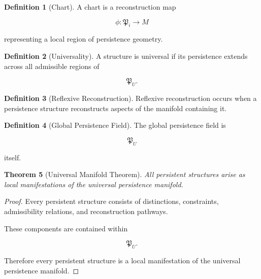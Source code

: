 \documentclass[12pt,oneside]{article}
\newtheorem{theorem}{Theorem}[section] \newtheorem{lemma}[theorem]{Lemma} \newtheorem{proposition}[theorem]{Proposition} \newtheorem{corollary}[theorem]{Corollary}
\theoremstyle{definition}
\newtheorem{definition}[theorem]{Definition} \newtheorem{axiom}[theorem]{Axiom} \newtheorem{remark}[theorem]{Remark} \newtheorem{example}[theorem]{Example}
\begin{document}
\begin{definition}[Chart]

A chart is a reconstruction map

\[
\phi :
\mathfrak P_i
\rightarrow
M
\]

representing a local region of persistence geometry.

\end{definition}

\begin{definition}[Universality]

A structure is universal if its persistence extends across all admissible regions of

\[
\mathfrak P_U.
\]

\end{definition}

\begin{definition}[Reflexive Reconstruction]

Reflexive reconstruction occurs when a persistence structure reconstructs aspects of the manifold containing it.

\end{definition}

\begin{definition}[Global Persistence Field]

The global persistence field is

\[
\mathfrak P_U
\]

itself.

\end{definition}

\begin{theorem}[Universal Manifold Theorem]

All persistent structures arise as local manifestations of the universal persistence manifold.

\end{theorem}

\begin{proof}

Every persistent structure consists of distinctions, constraints, admissibility relations, and reconstruction pathways.

These components are contained within

\[
\mathfrak P_U.
\]

Therefore every persistent structure is a local manifestation of the universal persistence manifold.

\end{proof}
\end{document}
